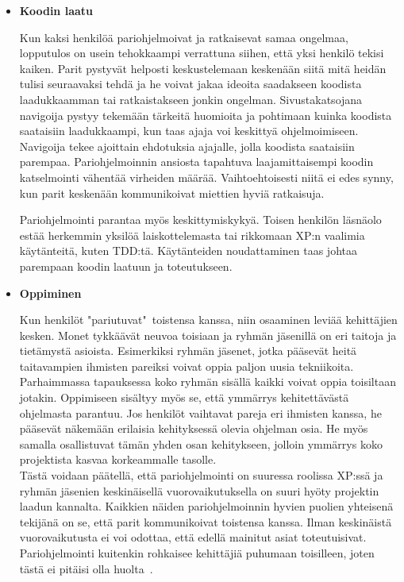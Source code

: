 \documentclass[finnish]{../tktltiki2}
\theoremstyle{definition}
\theoremstyle{remark}
\begin{document}
\begin{itemize}

\item {\bf Koodin laatu}

Kun kaksi henkilöä pariohjelmoivat ja ratkaisevat samaa ongelmaa, 
lopputulos on usein tehokkaampi verrattuna siihen, että yksi henkilö 
tekisi kaiken. Parit pystyvät helposti keskustelemaan keskenään siitä 
mitä heidän tulisi seuraavaksi tehdä ja he voivat jakaa ideoita 
saadakseen koodista laadukkaamman tai ratkaistakseen jonkin ongelman. 
Sivustakatsojana navigoija pystyy tekemään tärkeitä huomioita ja 
pohtimaan kuinka koodista saataisiin laadukkaampi, kun taas ajaja voi 
keskittyä ohjelmoimiseen. Navigoija tekee ajoittain ehdotuksia 
ajajalle, jolla koodista saataisiin parempaa.
Pariohjelmoinnin ansiosta tapahtuva laajamittaisempi koodin 
katselmointi vähentää virheiden määrää. Vaihtoehtoisesti
niitä ei edes synny, kun parit keskenään kommunikoivat miettien hyviä 
ratkaisuja.

Pariohjelmointi parantaa myös keskittymiskykyä. Toisen henkilön 
läsnäolo estää herkemmin yksilöä laiskottelemasta tai rikkomaan XP:n
vaalimia käytänteitä, kuten TDD:tä. Käytänteiden noudattaminen taas 
johtaa parempaan koodin laatuun ja toteutukseen.

\item {\bf Oppiminen}

Kun henkilöt "pariutuvat"~toistensa kanssa, niin osaaminen 
leviää kehittäjien kesken. Monet tykkäävät neuvoa toisiaan ja ryhmän 
jäsenillä
on eri taitoja ja tietämystä asioista. Esimerkiksi ryhmän jäsenet, 
jotka pääsevät heitä taitavampien ihmisten pareiksi voivat oppia
paljon uusia tekniikoita. Parhaimmassa tapauksessa koko ryhmän sisällä 
kaikki voivat oppia toisiltaan jotakin.
Oppimiseen sisältyy myös se, että ymmärrys kehitettävästä ohjelmasta 
parantuu. Jos henkilöt vaihtavat
pareja eri ihmisten kanssa, he pääsevät näkemään erilaisia 
kehityksessä olevia ohjelman osia. He myös samalla osallistuvat tämän 
yhden osan
kehitykseen, jolloin ymmärrys koko projektista kasvaa korkeammalle 
tasolle.\\

Tästä voidaan päätellä, että pariohjelmointi on suuressa roolissa 
XP:ssä ja ryhmän jäsenien keskinäisellä vuorovaikutuksella on suuri 
hyöty projektin laadun kannalta. Kaikkien näiden pariohjelmoinnin 
hyvien puolien yhteisenä tekijänä on se, että parit kommunikoivat 
toistensa kanssa. Ilman keskinäistä vuorovaikutusta ei voi odottaa, 
että edellä mainitut asiat toteutuisivat. Pariohjelmointi kuitenkin 
rohkaisee kehittäjiä puhumaan toisilleen, joten tästä ei pitäisi olla 
huolta~\cite{Zarb:2012:UCW:2384716.2384738}.

\end{itemize}
\end{document}

